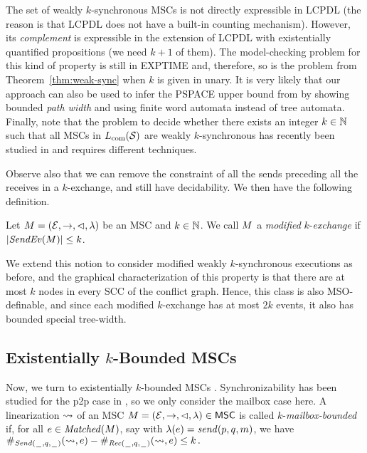 \documentclass{article}
\begin{document}
\begin{remark}
The set of weakly $k$-synchronous MSCs is not directly expressible in LCPDL
(the reason is that LCPDL does not have a built-in counting mechanism).
However, its \emph{complement} is expressible in the extension of LCPDL with
existentially quantified propositions
(we need $k+1$ of them). The model-checking problem for
this kind of property is still in EXPTIME and, therefore, so is the problem from
Theorem~\ref{thm:weak-sync} when $k$ is given in unary. It is very likely that our approach can also be used to
infer the PSPACE upper bound from \cite{DBLP:conf/cav/BouajjaniEJQ18}
by showing bounded \emph{path width} and using finite word automata instead of tree automata.
Finally, note that
the problem to decide whether there exists an integer $k \in \mathbb{N}$ such that all MSCs in $L_{\textup{com}}(\mathcal{S})$
are weakly $k$-synchronous
has recently been studied in \cite{DLL2021} and requires different techniques.
\end{remark}

Observe also that we can remove the constraint of all the sends preceding all the receives in a $k$-exchange, and still have decidability. We then have the following definition.

\begin{definition}\label{def:mod-weak-synchr}
	Let $M = (\mathcal{E},\to,\lhd,\lambda)$ be an MSC
	and $k \in \mathbb{N}$.
	We call $M$ a \emph{modified} $k$-\emph{exchange} if $|\mathit{SendEv}(M)| \le k$.
\end{definition}

We extend this notion to consider modified weakly $k$-synchronous executions as before, and the graphical characterization of this property is that there are at most $k$ nodes in every SCC of the conflict graph. Hence, this class is also MSO-definable, and since each modified $k$-exchange has at most $2k$ events, it also has bounded special tree-width. 

\subsection{Existentially $k$-Bounded MSCs}

Now, we turn to existentially $k$-bounded MSCs \cite{DBLP:conf/fossacs/LohreyM02,DBLP:conf/dlt/GenestMK04,GKM07}.
Synchronizability has been studied for the p2p case in \cite{GKM07}, so we only consider the mailbox case here.
A linearization $\rightsquigarrow$ of an MSC $M = (\mathcal{E},\to,\lhd,\lambda) \in \mathsf{MSC}$ is called
$k$-\emph{mailbox-bounded} if, for all $e \in \mathit{Matched}(M)$, say with $\lambda(e) = \mathit{send}(p, q, m)$,
we have $\#_{{\mathit{Send}(\hspace{0.1em}\underline{\hspace{0.5em}}\hspace{0.1em},q,\hspace{0.1em}\underline{\hspace{0.5em}}\hspace{0.1em})}}(\rightsquigarrow,e) - \#_{{\mathit{Rec}(\hspace{0.1em}\underline{\hspace{0.5em}}\hspace{0.1em},q,\hspace{0.1em}\underline{\hspace{0.5em}}\hspace{0.1em})}}(\rightsquigarrow,e) \le k\,.$
\end{document}
